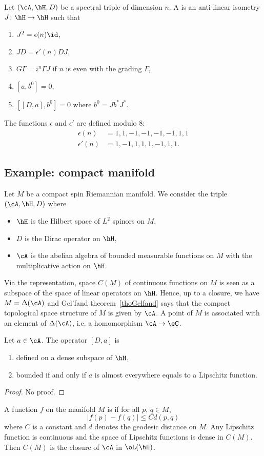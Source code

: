 Let $(\cA,\hH,D)$ be a spectral triple of dimension $n$. A  is an anti-linear isometry $J\colon \hH\to \hH$ such that
\begin{enumerate}
	\item $J^2=\epsilon(n)\id$,
	\item $JD=\epsilon'(n)DJ$,
	\item $G\Gamma=i^n\Gamma J$ if $n$ is even with the grading $\Gamma$,
	\item $[a,b^0]=0$,
	\item $[ [D,a],b^0 ]=0$ where $b^0=Jb^*J^*$.
\end{enumerate}
The functions $\epsilon$ and $\epsilon'$ are defined modulo $8$:
\[
	\begin{split}
		\epsilon(n)&=1,1,-1,-1,-1,-1,1,1\\
		\epsilon'(n)&=1,-1,1,1,1,-1,1,1.
	\end{split}
\]

\subsection{Example: compact manifold}

Let $M$ be a compact spin Riemannian manifold. We consider the triple $(\cA,\hH,D)$ where
\begin{itemize}
	\item $\hH$ is the Hilbert space of $L^2$ spinors on $M$,
	\item $D$ is the Dirac operator on $\hH$,
	\item $\cA$ is the abelian algebra of bounded measurable functions on $M$ with the multiplicative action on $\hH$.
\end{itemize}
Via the representation, space $C(M)$ of continuous functions on $M$ is seen as a subspace of the space of linear operators on $\hH$. Hence, up to a closure, we have $M=\Delta(\cA)$ and Gel'fand theorem~\ref{thoGelfand} says that the compact topological space structure of $M$ is given by $\cA$. A point of $M$ is associated with an element of $\Delta(\cA)$, i.e. a homomorphism $\cA\to\eC$.

\begin{proposition}
	Let $a\in\cA$. The operator $[D,a]$ is
	\begin{enumerate}
		\item defined on a dense subspace of $\hH$,
		\item bounded if and only if $a$ is almost everywhere equals to a Lipschitz function.
	\end{enumerate}

\end{proposition}
\begin{proof}
	No proof.
\end{proof}

A function $f$ on the manifold $M$ is  if for all $p$, $q\in M$,
\[
	| f(p)-f(q) |\leq C d(p,q)
\]
where $C$ is a constant and $d$ denotes the geodesic distance on $M$. Any Lipschitz function is continuous and the space of Lipschitz functions is dense in $C(M)$. Then $C(M)$ is the closure of $\cA$ in $\oL(\hH)$.
